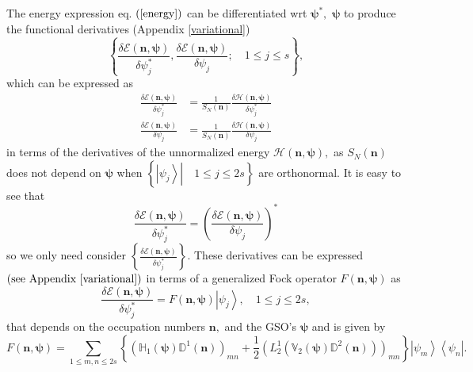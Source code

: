 \documentclass[aps,preprint]{revtex4}%
\begin{document}
The energy expression eq. $\left(  \ref{energy}\right)  $ can be
differentiated wrt $\mathbf{\psi}^{\ast},$ $\mathbf{\psi}$ to produce the
functional derivatives (Appendix \ref{variational})
\begin{equation}
\left\{  \frac{\delta\mathcal{E}\left(  \mathbf{n,\psi}\right)  }{\delta
\psi_{j}^{\ast}},\frac{\delta\mathcal{E}\left(  \mathbf{n,\psi}\right)
}{\delta\psi_{j}};\quad1\leq j\leq s\right\}  ,
\end{equation}
which can be expressed as%
\begin{align}
\frac{\delta\mathcal{E}\left(  \mathbf{n,\psi}\right)  }{\delta\psi_{j}^{\ast
}}  &  =\frac{1}{S_{N}\left(  \mathbf{n}\right)  }\frac{\delta\mathcal{H}%
\left(  \mathbf{n,\psi}\right)  }{\delta\psi_{j}^{\ast}}\\
\frac{\delta\mathcal{E}\left(  \mathbf{n,\psi}\right)  }{\delta\psi_{j}}  &
=\frac{1}{S_{N}\left(  \mathbf{n}\right)  }\frac{\delta\mathcal{H}\left(
\mathbf{n,\psi}\right)  }{\delta\psi_{j}}%
\end{align}
in terms of the derivatives of the unnormalized energy $\mathcal{H}\left(
\mathbf{n,\psi}\right)  ,$ as $S_{N}\left(  \mathbf{n}\right)  $ does not
depend on $\mathbf{\psi}$ when $\left\{  \left.  \left\vert \psi
_{j}\right\rangle \right\vert \quad1\leq j\leq2s\right\}  $ are orthonormal.
It is easy to see that
\begin{equation}
\frac{\delta\mathcal{E}\left(  \mathbf{n,\psi}\right)  }{\delta\psi_{j}^{\ast
}}=\left(  \frac{\delta\mathcal{E}\left(  \mathbf{n,\psi}\right)  }{\delta
\psi_{j}}\right)  ^{\ast}%
\end{equation}
so we only need consider $\left\{  \frac{\delta\mathcal{E}\left(
\mathbf{n,\psi}\right)  }{\delta\psi_{j}^{\ast}}\right\}  .$ These derivatives
can be expressed $\left(  \text{see Appendix \ref{variational}}\right)  $ in
terms of a generalized Fock operator $F\left(  \mathbf{n,\psi}\right)  $ as
\begin{equation}
\frac{\delta\mathcal{E}\left(  \mathbf{n,\psi}\right)  }{\delta\psi_{j}^{\ast
}}=F\left(  \mathbf{n,\psi}\right)  \left\vert \psi_{j}\right\rangle
,\quad1\leq j\leq2s, \label{H_deriv}%
\end{equation}
that depends on the occupation numbers $\mathbf{n,}$ and the GSO's
$\mathbf{\psi}$ and is given by
\begin{equation}
F\left(  \mathbf{n,\psi}\right)  =\sum_{1\leq m,n\leq2s}\left\{  \left(
\mathbb{H}_{1}\left(  \mathbf{\psi}\right)  \mathbb{D}^{1}\left(
\mathbf{n}\right)  \right)  _{mn}+\frac{1}{2}\left(  L_{2}^{1}\left(
\mathbb{V}_{2}\left(  \mathbf{\psi}\right)  \mathbb{D}^{2}\left(
\mathbf{n}\right)  \right)  \right)  _{mn}\right\}  \left\vert \psi
_{m}\right\rangle \left\langle \psi_{n}\right\vert . \label{genfock}%
\end{equation}
\end{document}
